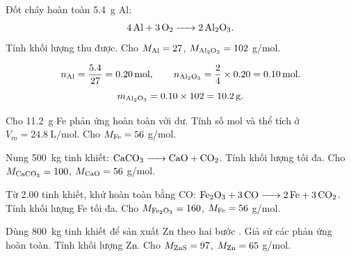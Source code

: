 \begin{vidu}
Đốt cháy hoàn toàn \SI{5.4}{\gram} Al:
\[
\ce{4Al + 3O2 -> 2Al2O3}.
\]
Tính khối lượng  thu được. Cho \(M_{\ce{Al}}=27\), \(M_{\ce{Al2O3}}=102\) g/mol.
\end{vidu}
\begin{loigiai}
\[
n_{\ce{Al}}=\frac{5.4}{27}=\SI{0.20}{\mole},\qquad
n_{\ce{Al2O3}}=\frac{2}{4}\times0.20=\SI{0.10}{\mole}.
\]
\[
m_{\ce{Al2O3}}=0.10\times102=\SI{10.2}{\gram}.
\]
\end{loigiai}

\begin{tuluyen}
Cho \SI{11.2}{\gram} Fe phản ứng hoàn toàn với  dư. Tính số mol và thể tích  ở \(V_m=\SI{24.8}{\liter\per\mole}\). Cho \(M_{\ce{Fe}}=56\) g/mol.
\end{tuluyen}

\begin{tuluyen}
Nung \SI{500}{\kilo\gram}  tinh khiết: \(\ce{CaCO3 -> CaO + CO2}\). Tính khối lượng  tối đa. Cho \(M_{\ce{CaCO3}}=100\), \(M_{\ce{CaO}}=56\) g/mol.
\end{tuluyen}

\begin{tuluyen}
Từ \SI{2.00}{\ton}  tinh khiết, khử hoàn toàn bằng CO: \(\ce{Fe2O3 + 3CO -> 2Fe + 3CO2}\). Tính khối lượng Fe tối đa. Cho \(M_{\ce{Fe2O3}}=160\), \(M_{\ce{Fe}}=56\) g/mol.
\end{tuluyen}

\begin{tuluyen}
Dùng \SI{800}{\kilo\gram}  tinh khiết để sản xuất Zn theo hai bước . Giả sử các phản ứng hoàn toàn. Tính khối lượng Zn. Cho \(M_{\ce{ZnS}}=97\), \(M_{\ce{Zn}}=65\) g/mol.
\end{tuluyen}
